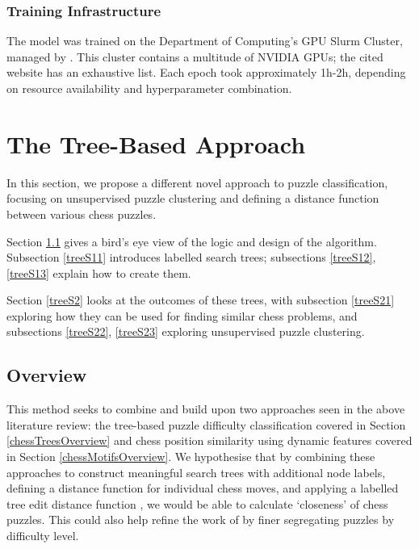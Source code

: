 \subsection{Training Infrastructure}\label{mlS23}

The model was trained on the Department of Computing's GPU Slurm Cluster,
managed by \citet{csgGPU}. This cluster contains a multitude of NVIDIA GPUs;
the cited website has an exhaustive list. Each epoch took approximately 1h-2h,
depending on resource availability and hyperparameter combination.

\chapter{The Tree-Based Approach}\label{treeChapter}

In this section, we propose a different novel approach to puzzle
classification, focusing on unsupervised puzzle clustering and defining a
distance function between various chess puzzles.

Section \ref{treeS1} gives a bird's eye view of the logic and design of the
algorithm. Subsection \ref{treeS11} introduces labelled search trees;
subsections \ref{treeS12}, \ref{treeS13} explain how to create them.

Section \ref{treeS2} looks at the outcomes of these trees, with subsection
\ref{treeS21} exploring how they can be used for finding similar chess
problems, and subsections \ref{treeS22}, \ref{treeS23} exploring unsupervised
puzzle clustering.

\section{Overview}\label{treeS1}

This method seeks to combine and build upon two approaches seen in the above
literature review: the tree-based puzzle difficulty classification
\citep{chessTrees} covered in Section \ref{chessTreesOverview} and chess
position similarity using dynamic features \citep{chessMotifs} covered in
Section \ref{chessMotifsOverview}. We hypothesise that by combining these
approaches to construct meaningful search trees with additional node labels,
defining a distance function for individual chess moves, and applying a
labelled tree edit distance function \citep{editDistTrees}, we would be able to
calculate `closeness' of chess puzzles. This could also help refine the work of
\citet{chessTrees} by finer segregating puzzles by difficulty level.

